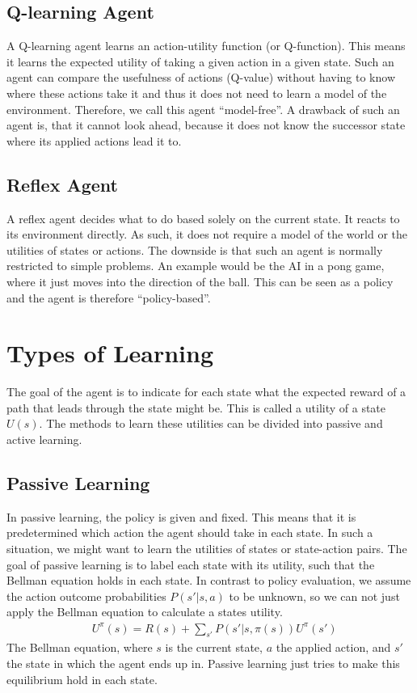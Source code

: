 \documentclass{llncs}
\begin{document}
\subsection{Q-learning Agent}
A Q-learning agent learns an action-utility function (or Q-function). This means it learns the expected utility of taking a given action in a given state. Such an agent can compare the usefulness of actions (Q-value) without having to know where these actions take it and thus it does not need to learn a model of the environment. Therefore, we call this agent ``model-free''. A drawback of such an agent is, that it cannot look ahead, because it does not know the successor state where its applied actions lead it to.

\subsection{Reflex Agent}
A reflex agent decides what to do based solely on the current state. It reacts to its environment directly. As such, it does not require a model of the world or the utilities of states or actions. The downside is that such an agent is normally restricted to simple problems. An example would be the AI in a pong game, where it just moves into the direction of the ball. This can be seen as a policy and the agent is therefore ``policy-based''.


\section{Types of Learning}
The goal of the agent is to indicate for each state what the expected reward of a path that leads through the state might be. This is called a utility of a state $U(s)$. The methods to learn these utilities can be divided into passive and active learning.

\subsection{Passive Learning}
In passive learning, the policy is given and fixed. This means that it is predetermined which action the agent should take in each state. In such a situation, we might want to learn the utilities of states or state-action pairs. The goal of passive learning is to label each state with its utility, such that the Bellman equation holds in each state. In contrast to policy evaluation, we assume the action outcome probabilities $P(s'|s,a)$ to be unknown, so we can not just apply the Bellman equation to calculate a states utility.
\begin{align*}
	&U^{\pi}(s)=R(s)+\sum_{s'}P(s'|s,\pi(s))U^{\pi}(s')
\end{align*}
The Bellman equation, where $s$ is the current state, $a$ the applied action, and $s'$ the state in which the agent ends up in. Passive learning just tries to make this equilibrium hold in each state.
\end{document}
